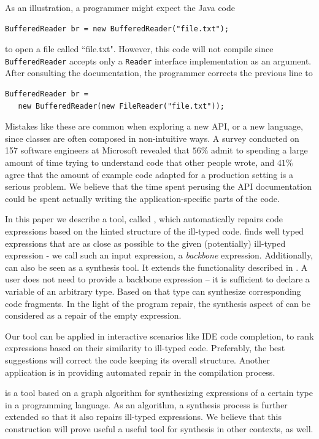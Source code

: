 As an illustration, a programmer might expect the Java code
\begin{lstlisting}
BufferedReader br = new BufferedReader("file.txt");
\end{lstlisting}
to open a file called ``file.txt". However, this code will not compile since \texttt{BufferedReader} accepts only a \texttt{Reader} interface implementation as an argument. After consulting the documentation, the programmer corrects the previous line to
\begin{lstlisting}
BufferedReader br = 
   new BufferedReader(new FileReader("file.txt"));
\end{lstlisting}
Mistakes like these are common when exploring a new API, or a new language, 
since classes are often composed in non-intuitive ways. A survey conducted on 
157 software engineers at Microsoft \cite{LaToza:2006} revealed that
$56\%$ admit to spending a large amount of time trying to understand code that other people wrote, and $41\%$ agree that the amount of example code adapted for a production setting is a serious problem. We believe that the time spent perusing the API documentation could be spent actually writing the application-specific parts of the code. 

In this paper we describe a tool, called \ourTool, which
automatically repairs code expressions based on the hinted structure
of the ill-typed code. \ourTool finds well typed expressions that are as close as 
possible to the given (potentially) ill-typed expression - we call such an
input expression, a {\em backbone} expression. Additionally, \ourTool can also be 
seen as a synthesis tool. It extends the functionality described in \cite{MandelinetALL2005Jungloid, GveroETAL13CompleteCompletionTypesWeights, PerelmanGBG12}.
A user does not need to provide a backbone expression -- it is sufficient to declare a variable of an arbitrary type. Based on that type \ourTool can synthesize corresponding code fragments. In the light of the program repair, the synthesis aspect of \ourTool can be 
considered as a repair of the empty expression. 

Our tool can be applied in interactive scenarios like IDE code completion, to rank expressions 
based on their similarity to ill-typed code. Preferably, the best
suggestions will correct the code keeping its overall structure.
Another application is in providing automated repair in the compilation process.

\ourTool is a tool based on a graph algorithm for synthesizing expressions of a certain type in a programming language. As an algorithm, a synthesis process is further 
extended so that it also repairs ill-typed expressions. We believe that this construction will prove useful a useful tool for synthesis in other contexts, as well.


